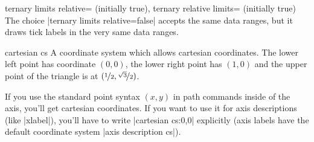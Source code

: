 \begin{pgfplotskeylist}{%
	ternary limits relative= (initially true),
	ternary relative limits= (initially true)}
	The choice |ternary limits relative=false| accepts the same data ranges, but it draws tick labels in the very same data ranges.
\begin{codeexample}[]
\end{codeexample}
\end{pgfplotskeylist}

\begin{coordinatesystem}{cartesian cs}
	A coordinate system which allows cartesian coordinates. The lower left point has coordinate $(0,0)$, the lower right point has $(1,0)$ and the upper point of the triangle is at $(\nicefrac12, \nicefrac{\sqrt3}{2})$.

	If you use the standard point syntax $(x,y)$ in path commands inside of the axis, you'll get cartesian coordinates. If you want to use it for axis descriptions (like |xlabel|), you'll have to write |cartesian cs:0,0| explicitly (axis labels have the default coordinate system |axis description cs|).
\begin{codeexample}[]
\end{codeexample}
\end{coordinatesystem}

